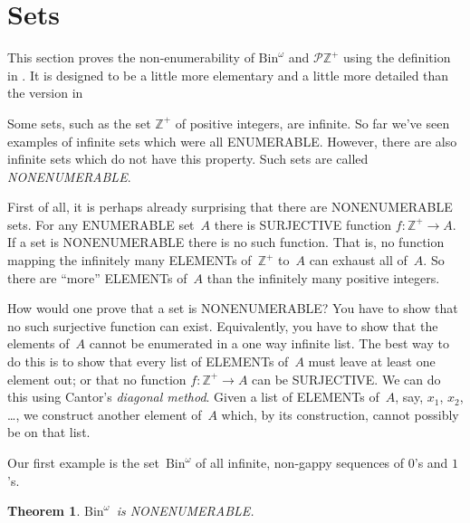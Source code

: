 \documentclass[10pt,a4paper]{article}
\makeatletter
\newcommand*{\olup}[1]{\MakeUppercase{#1}}
\theoremstyle{plain}
\newtheorem{thm}{Theorem}[section]
\theoremstyle{definition}
\theoremstyle{remark}
\newenvironment{editorial}{}{}
\newcommand*{\olfileid}[3]{}
\newcommand*{\olsection}[1]{\section*{#1}}
\newcommand*{\ollabel}[1]{\label{#1}}
\newcommand{\olref}{\@ifnextchar[{\olref@i}{\olref@final}}
\def\olref@i[#1]{\@ifnextchar[{\olref@ii}{\olref@final}}
\def\olref@ii[#1]{\@ifnextchar[{\olref@iii}{\olref@final}}
\def\olref@iii[#1]{\olref@final}
\def\olref@final#1{\ref{#1}}
\providecommand{\PosInt}{\mathbb{Z}^{+}}
\providecommand{\Bin}{\mathrm{Bin}}
\providecommand{\Pow}{\mathcal{P}}
\makeatother
\begin{document}
\olfileid{sfr}{siz}{nen}

\olsection{ Sets}

\begin{editorial}
  This section proves the non-enumerability of $\Bin^\omega$ and
  $\Pow{\PosInt}$ using the definition in \olref[enm]{sec}. It is
  designed to be a little more elementary and a little more detailed
  than the version in \olref[enm-alt]{sec}
\end{editorial}

Some sets, such as the set $\PosInt$ of positive integers, are
infinite. So far we've seen examples of infinite sets which were all
\olup{enumerable}. However, there are also infinite sets which do not
have this property. Such sets are called \emph{\olup{nonenumerable}}.

First of all, it is perhaps already surprising that there are
\olup{nonenumerable} sets.  For any \olup{enumerable} set~$A$ there is
\olup{surjective} function $f \colon \PosInt \to A$.  If a set is
\olup{nonenumerable} there is no such function.  That is, no function
mapping the infinitely many \olup{element}s of~$\PosInt$ to~$A$ can
exhaust all of~$A$.  So there are ``more'' \olup{element}s of~$A$ than
the infinitely many positive integers.

How would one prove that a set is \olup{nonenumerable}? You have to show
that no such surjective function can exist. Equivalently, you have to
show that the elements of~$A$ cannot be enumerated in a one way
infinite list.  The best way to do this is to show that every list of
\olup{element}s of~$A$ must leave at least one element out; or that no
function $f\colon \PosInt \to A$ can be \olup{surjective}.  We can do this
using Cantor's \emph{diagonal method}.  Given a list of \olup{element}s
of~$A$, say, $x_1$, $x_2$, \dots, we construct another element of~$A$
which, by its construction, cannot possibly be on that list.

Our first example is the set~$\Bin^\omega$ of all infinite, non-gappy
sequences of $0$'s and $1$'s.

\begin{thm}
\ollabel{thm:nonenum-bin-omega}
$\Bin^\omega$~is \olup{nonenumerable}.
\end{thm}
\end{document}
